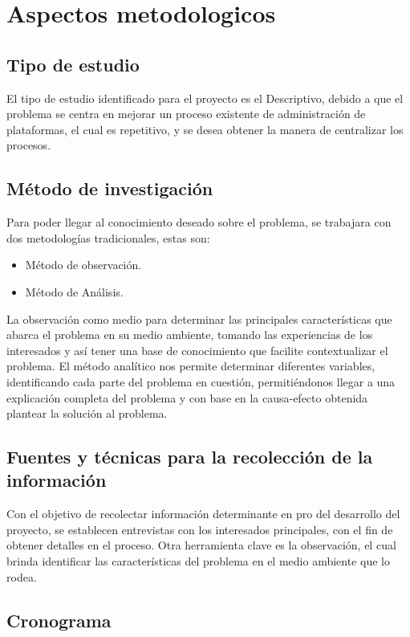\section{Aspectos metodologicos}
\subsection{Tipo de estudio}
El tipo de estudio identificado para el proyecto es el Descriptivo, debido a que el problema se centra en mejorar un proceso existente de administración de plataformas, el cual es repetitivo, y se desea obtener la manera de centralizar los procesos.
\subsection{Método de investigación}
	Para poder llegar al conocimiento deseado sobre el problema, se trabajara con dos metodologías tradicionales, estas son:
\begin{itemize}
    \item Método de observación.
    \item Método de Análisis.
\end{itemize}
La observación como medio para determinar las principales características  que abarca el problema en su medio ambiente, tomando las experiencias de los interesados y así tener una base de conocimiento que facilite contextualizar el problema.
\newline
El método analítico nos permite determinar diferentes variables, identificando cada parte del problema en cuestión,  permitiéndonos llegar a una explicación completa del problema y con base en la causa-efecto obtenida plantear la solución al problema.
\subsection{Fuentes y técnicas para la recolección de la información}
	Con el objetivo de recolectar información determinante en pro del desarrollo del proyecto, se establecen entrevistas con los interesados principales, con el fin de obtener detalles en el proceso. Otra herramienta clave es la observación, el cual brinda identificar las características del problema en el medio ambiente que lo rodea.
\newpage
\subsection{Cronograma}
